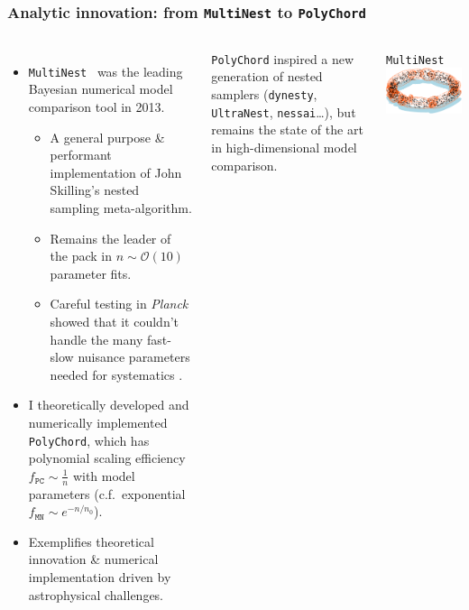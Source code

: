 \documentclass[aspectratio=169, handout]{beamer}
\begin{document}
\begin{frame}
    \frametitle{Analytic innovation: from \texttt{MultiNest} to \texttt{PolyChord}}
    \begin{columns}
        \begin{itemize}
            \item \texttt{MultiNest}~ was the leading Bayesian numerical model comparison tool in 2013.
                \begin{itemize}
                    \item A general purpose \& performant implementation of John Skilling's nested sampling meta-algorithm.
                    \item Remains the leader of the pack in $n\sim\mathcal{O}(10)$ parameter fits.
                    \item Careful testing in \textit{Planck} showed that it couldn't handle the many fast-slow nuisance parameters needed for systematics .
                \end{itemize}
            \item I theoretically developed and numerically implemented \texttt{PolyChord}, which has polynomial scaling efficiency $f_{\texttt{PC}}\sim \frac{1}{n}$ with model parameters (c.f.\ exponential $f_{\texttt{MN}}\sim e^{-n/n_0}$).
            \item Exemplifies theoretical innovation \& numerical implementation driven by astrophysical challenges.
        \end{itemize}
        \texttt{PolyChord} inspired a new generation of nested samplers (\texttt{dynesty}, \texttt{UltraNest}, \texttt{nessai}\ldots), but remains the state of the art in high-dimensional model comparison.
        \vspace{-10pt}
        \begin{block}{\texttt{MultiNest}~}
            \includegraphics[width=\textwidth]{figures/multinest.pdf}

\end{block}
\end{columns}
\end{frame}
\end{document}
